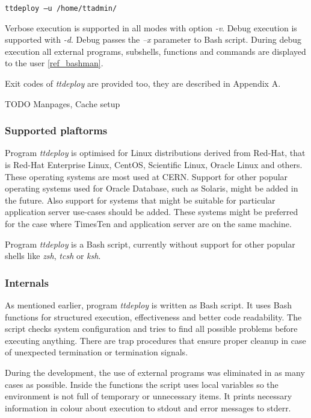 \documentclass[11pt, letterpaper]{article}
\begin{document}
\begin{lstlisting}
ttdeploy –u /home/ttadmin/
\end{lstlisting}

Verbose execution is supported in all modes with option \emph{-v}. Debug execution is supported with \emph{-d}. Debug passes the \emph{–x} parameter to Bash script. During debug execution all external programs, subshells, functions and commands are displayed to the user \ref{ref_bashman}.

Exit codes of \emph{ttdeploy} are provided too, they are described in Appendix A.

TODO Manpages, Cache setup

\subsubsection{Supported plaftorms}

Program \emph{ttdeploy} is optimised for Linux distributions derived from Red-Hat, that is Red-Hat Enterprise Linux, CentOS, Scientific Linux, Oracle Linux and others. These operating systems are most used at CERN. Support for other popular operating systems used for Oracle Database, such as Solaris, might be added in the future. Also support for systems that might be suitable for particular application server use-cases should be added. These systems might be preferred for the case where TimesTen and application server are on the same machine.

Program \emph{ttdeploy} is a Bash script, currently without support for other popular shells like \emph{zsh}, \emph{tcsh} or \emph{ksh}.

\subsubsection{Internals}

As mentioned earlier, program \emph{ttdeploy} is written as Bash script. It uses Bash functions for structured execution, effectiveness and better code readability. The script checks system configuration and tries to find all possible problems before executing anything. There are trap procedures that ensure proper cleanup in case of unexpected termination or termination signals.

During the development, the use of external programs was eliminated in as many cases as possible. Inside the functions the script uses local variables so the environment is not full of temporary or unnecessary items. It prints necessary information in colour about execution to stdout and error messages to stderr.
\end{document}

